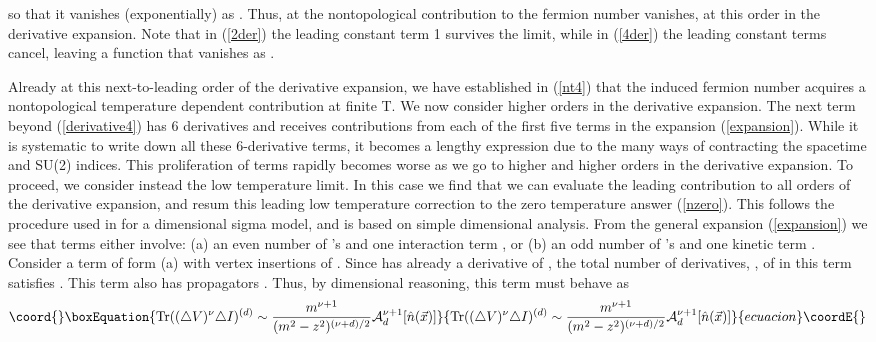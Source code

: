 \documentclass[a4paper,prd]{revtex4}
\begin{document}
so that it vanishes (exponentially) as \coordHE{}.  Thus, at \coordHE{} the 
nontopological contribution to the  fermion number vanishes, at this
order in the derivative expansion.  Note that in (\ref{2der})
the leading constant term 1 survives the \coordHE{} limit, while  in
(\ref{4der}) the leading constant terms cancel, leaving a
function that vanishes as \coordHE{}. 

Already at this next-to-leading order of the derivative expansion, we
have established in (\ref{nt4}) that the induced fermion number acquires
a nontopological temperature dependent contribution at finite T. We now
consider higher orders in the derivative expansion. The next term beyond
(\ref{derivative4}) has 6 derivatives and receives contributions from
each of the first five terms in the expansion (\ref{expansion}). While
it is systematic to write down all these 6-derivative terms, it
becomes a lengthy expression due to the many ways of contracting the
spacetime and SU(2) indices. This proliferation of terms
rapidly becomes worse as we go to higher and higher orders in the
derivative expansion. To proceed, we consider instead the low temperature
limit. In this case we find that we can evaluate the leading contribution
to all orders of the derivative expansion, and resum this leading low
temperature correction to the zero temperature answer (\ref{nzero}).
This follows the procedure used in \cite{ad} for a \coordHE{} dimensional
sigma model, and is based on simple dimensional analysis.  From the
general expansion (\ref{expansion}) we see that terms either involve:
(a) an even number of \coordHE{}'s and one interaction term \coordHE{}, or (b) an odd
number of \coordHE{}'s and one kinetic term \coordHE{}. Consider a term of form (a) with
\myHighlight{$\nu$}\coordHE{} vertex insertions of \coordHE{}. Since \coordHE{} has already a derivative of
\coordHE{}, the total number of derivatives, \coordHE{}, of
\coordHE{} in this term satisfies \coordHE{}. This term also has
\coordHE{} propagators \myHighlight{$\triangle$}\coordHE{}. Thus, by dimensional reasoning, this term must
behave as
\begin{equation}\coord{}\boxEquation{
\textrm{Tr}((\triangle V)^{\nu}\triangle I)^{(d)}\sim 
\frac{m^{\nu +1}}{(m^{2}-z^{2})^{(\nu +d)/2}} \mathcal{A}_{d}^{\nu
+1}[\hat{n}(\vec{x})]
\label{dimensiona}
}{
\textrm{Tr}((\triangle V)^{\nu}\triangle I)^{(d)}\sim 
\frac{m^{\nu +1}}{(m^{2}-z^{2})^{(\nu +d)/2}} \mathcal{A}_{d}^{\nu
+1}[\hat{n}(\vec{x})]
}{ecuacion}\coordE{}\end{equation}
\end{document}
